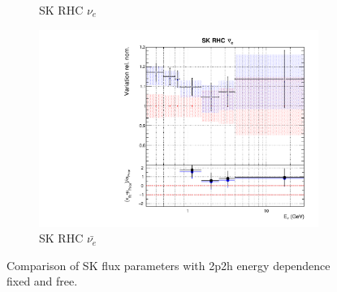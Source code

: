 \begin{figure}
\begin{subfigure}{0.45\textwidth}
  \caption{SK RHC $\nu_{e}$}
\end{subfigure}
\begin{subfigure}{0.45\textwidth}
  \centering
  \includegraphics[width=0.75\linewidth]{figs/fixed2p2hflux15}
  \caption{SK RHC $\bar{\nu_e}$}
\end{subfigure}
\caption{Comparison of SK flux parameters with 2p2h energy dependence fixed and free.}
\label{fig:fixed2p2hfluxSK}
\end{figure}

